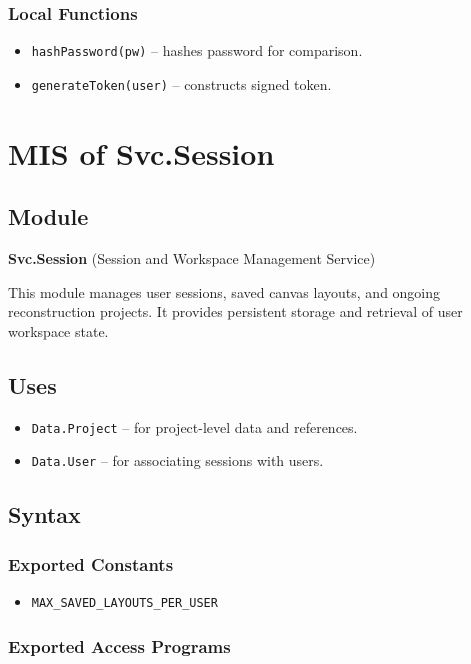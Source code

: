 \documentclass[12pt, titlepage]{article}
\begin{document}
\subsubsection{Local Functions}
\begin{itemize}
    \item \texttt{hashPassword(pw)} – hashes password for comparison.
    \item \texttt{generateToken(user)} – constructs signed token.
\end{itemize}



\section{MIS of Svc.Session} \label{Svc.Session}

\subsection{Module}
\textbf{Svc.Session} \; (Session and Workspace Management Service)

This module manages user sessions, saved canvas layouts, and ongoing reconstruction projects. It provides persistent storage and retrieval of user workspace state.

\subsection{Uses}
\begin{itemize}
    \item \texttt{Data.Project} – for project-level data and references.
    \item \texttt{Data.User} – for associating sessions with users.
\end{itemize}

\subsection{Syntax}

\subsubsection{Exported Constants}
\begin{itemize}
    \item \texttt{MAX\_SAVED\_LAYOUTS\_PER\_USER}
\end{itemize}

\subsubsection{Exported Access Programs}
\end{document}
